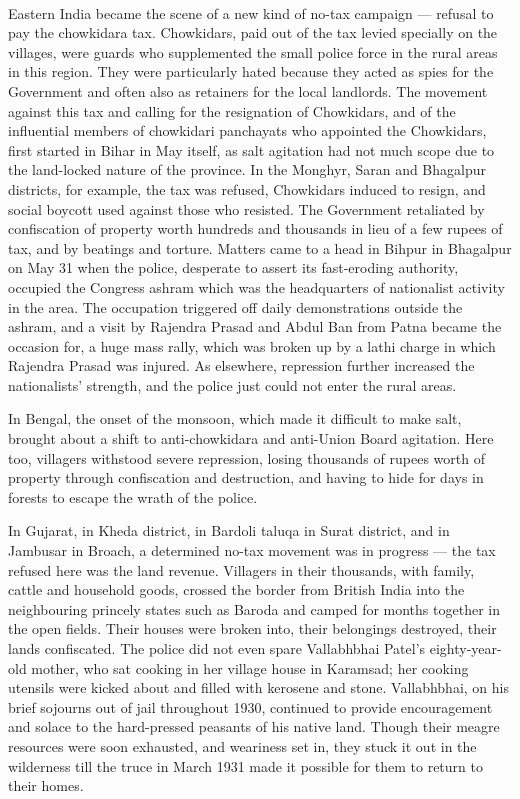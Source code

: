 \begin{multicols}{2}
\paragraph*{}
Eastern India became the scene of a new kind of no-tax campaign --- refusal to pay the chowkidara tax. Chowkidars, paid out of the tax levied specially on the villages, were guards who supplemented the small police force in the rural areas in this region. They were particularly hated because they acted as spies for the Government and often also as retainers for the local landlords. The movement against this tax and calling for the resignation of Chowkidars, and of the influential members of chowkidari panchayats who appointed the Chowkidars, first started in Bihar in May itself, as salt agitation had not much scope due to the land-locked nature of the province. In the Monghyr, Saran and Bhagalpur districts, for example, the tax was refused, Chowkidars induced to resign, and social boycott used against those who resisted. The Government retaliated by confiscation of property worth hundreds and thousands in lieu of a few rupees of tax, and by beatings and torture. Matters came to a head in Bihpur in Bhagalpur on May 31 when the police, desperate to assert its fast-eroding authority, occupied the Congress ashram which was the headquarters of nationalist activity in the area. The occupation triggered off daily demonstrations outside the ashram, and a visit by Rajendra Prasad and Abdul Ban from Patna became the occasion for, a huge mass rally, which was broken up by a lathi charge in which Rajendra Prasad was injured. As elsewhere, repression further increased the nationalists' strength, and the police just could not enter the rural areas.

In Bengal, the onset of the monsoon, which made it difficult to make salt, brought about a shift to anti-chowkidara and anti-Union Board agitation. Here too, villagers withstood severe repression, losing thousands of rupees worth of property through confiscation and destruction, and having to hide for days in forests to escape the wrath of the police.

In Gujarat, in Kheda district, in Bardoli taluqa in Surat district, and in Jambusar in Broach, a determined no-tax movement was in progress --- the tax refused here was the land revenue. Villagers in their thousands, with family, cattle and household goods, crossed the border from British India into the neighbouring princely states such as Baroda and camped for months together in the open fields. Their houses were broken into, their belongings destroyed, their lands confiscated. The police did not even spare Vallabhbhai Patel's eighty-year-old mother, who sat cooking in her village house in Karamsad; her cooking utensils were kicked about and filled with kerosene and stone. Vallabhbhai, on his brief sojourns out of jail throughout 1930, continued to provide encouragement and solace to the hard-pressed peasants of his native land. Though their meagre resources were soon exhausted, and weariness set in, they stuck it out in the wilderness till the truce in March 1931 made it possible for them to return to their homes.


\end{multicols}

